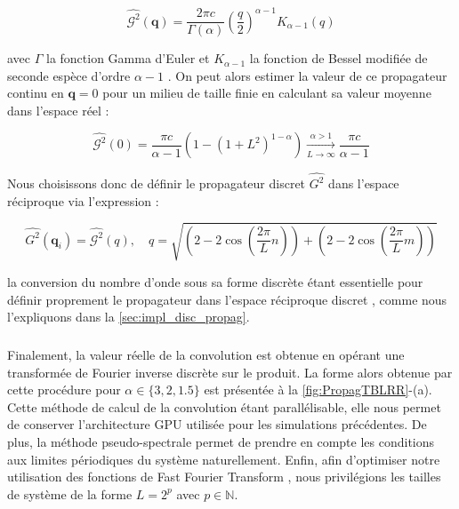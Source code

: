 \begin{equation}
	\hat{\mathcal{G}^2}(\mathbf{q})=\frac{2\pi c}{\Gamma\left(\alpha\right)} \left( \frac{q}{2} \right)^{\alpha-1}K_{\alpha-1}(q)
	\label{eq:propcontinu2D}
\end{equation}

\noindent avec $\Gamma$ la fonction Gamma d'Euler et $K_{\alpha -1}$ la fonction de Bessel modifiée de seconde espèce d'ordre $\alpha - 1$ \cite{abramowitz_handbook_1965}. On peut alors estimer la valeur de ce propagateur continu en $\mathbf{q}=0$ pour un milieu de taille finie en calculant sa valeur moyenne dans l'espace réel :

\begin{equation}
	\hat{\mathcal{G}^2}(0) = \frac{\pi c}{\alpha -1}\left( 1- \left( 1+L^2 \right)^{1-\alpha} \right) \xrightarrow[L\rightarrow\infty]{\alpha > 1} \frac{\pi c}{\alpha - 1}
	\label{eq:zerovalue}
\end{equation}

\noindent Nous choisissons donc de définir le propagateur discret $\hat{G^2}$ dans l'espace réciproque via l'expression :

\begin{equation}
	\hat{G^2}(\mathbf{q}_i) = \hat{\mathcal{G}^2}(q), \quad q = \sqrt{\left( 2-2\cos \left( \frac{2\pi}{L}n \right) \right) + \left( 2-2\cos \left( \frac{2\pi}{L}m \right) \right)}
\end{equation}

\noindent la conversion du nombre d'onde sous sa forme discrète étant essentielle pour définir proprement le propagateur dans l'espace réciproque discret \cite{ferrero_criticality_2019, rossi_finite-disorder_2022}, comme nous l'expliquons dans la \autoref{sec:impl_disc_propag}.

\subparagraph{}Finalement, la valeur réelle de la convolution est obtenue en opérant une transformée de Fourier inverse discrète sur le produit. La forme alors obtenue par cette procédure pour $\alpha \in \{ 3, 2, 1.5 \}$ est présentée à la \autoref{fig:PropagTBLRR}-(a). Cette méthode de calcul de la convolution étant parallélisable, elle nous permet de conserver l'architecture GPU utilisée pour les simulations précédentes. De plus, la méthode pseudo-spectrale permet de prendre en compte les conditions aux limites périodiques du système naturellement. Enfin, afin d'optimiser notre utilisation des fonctions de Fast Fourier Transform \cite{cooley_algorithm_1965}, nous privilégions les tailles de système de la forme $L = 2^p$ avec $p \in \mathbb{N}$.

